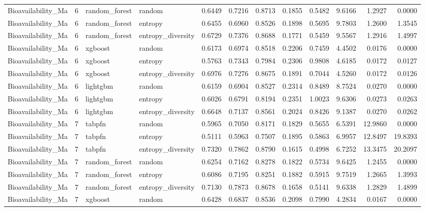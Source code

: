 \begin{tabular}{lrllrrrrrrrr}
Bioavailability_Ma & 6 & random_forest & random & 0.6449 & 0.7216 & 0.8713 & 0.1855 & 0.5482 & 9.6166 & 1.2927 & 0.0000 \\
Bioavailability_Ma & 6 & random_forest & entropy & 0.6455 & 0.6960 & 0.8526 & 0.1898 & 0.5695 & 9.7803 & 1.2600 & 1.3545 \\
Bioavailability_Ma & 6 & random_forest & entropy_diversity & 0.6729 & 0.7376 & 0.8688 & 0.1771 & 0.5459 & 9.5567 & 1.2916 & 1.4997 \\
Bioavailability_Ma & 6 & xgboost & random & 0.6173 & 0.6974 & 0.8518 & 0.2206 & 0.7459 & 4.4502 & 0.0176 & 0.0000 \\
Bioavailability_Ma & 6 & xgboost & entropy & 0.5763 & 0.7343 & 0.7984 & 0.2306 & 0.9808 & 4.6185 & 0.0172 & 0.0127 \\
Bioavailability_Ma & 6 & xgboost & entropy_diversity & 0.6976 & 0.7276 & 0.8675 & 0.1891 & 0.7044 & 4.5260 & 0.0172 & 0.0126 \\
Bioavailability_Ma & 6 & lightgbm & random & 0.6159 & 0.6904 & 0.8527 & 0.2314 & 0.8489 & 8.7524 & 0.0270 & 0.0000 \\
Bioavailability_Ma & 6 & lightgbm & entropy & 0.6026 & 0.6791 & 0.8194 & 0.2351 & 1.0023 & 9.6306 & 0.0273 & 0.0263 \\
Bioavailability_Ma & 6 & lightgbm & entropy_diversity & 0.6648 & 0.7137 & 0.8561 & 0.2024 & 0.8426 & 9.1387 & 0.0270 & 0.0262 \\
Bioavailability_Ma & 7 & tabpfn & random & 0.5965 & 0.7050 & 0.8171 & 0.1829 & 0.5655 & 6.5391 & 12.9860 & 0.0000 \\
Bioavailability_Ma & 7 & tabpfn & entropy & 0.5111 & 0.5963 & 0.7507 & 0.1895 & 0.5863 & 6.9957 & 12.8497 & 19.8393 \\
Bioavailability_Ma & 7 & tabpfn & entropy_diversity & 0.7320 & 0.7862 & 0.8790 & 0.1615 & 0.4998 & 6.7252 & 13.3475 & 20.2097 \\
Bioavailability_Ma & 7 & random_forest & random & 0.6254 & 0.7162 & 0.8278 & 0.1822 & 0.5734 & 9.6425 & 1.2455 & 0.0000 \\
Bioavailability_Ma & 7 & random_forest & entropy & 0.6086 & 0.7195 & 0.8251 & 0.1882 & 0.5915 & 9.7519 & 1.2665 & 1.3993 \\
Bioavailability_Ma & 7 & random_forest & entropy_diversity & 0.7130 & 0.7873 & 0.8678 & 0.1658 & 0.5141 & 9.6338 & 1.2829 & 1.4899 \\
Bioavailability_Ma & 7 & xgboost & random & 0.6428 & 0.6837 & 0.8536 & 0.2098 & 0.7990 & 4.2834 & 0.0167 & 0.0000 \\

\end{tabular}
